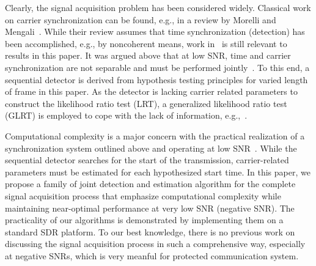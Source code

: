 Clearly, the signal acquisition problem has been considered widely. 
Classical work on carrier synchronization can be found, e.g., in a
review by  Morelli
and Mengali~\cite{Morelli_Mengali_98}. 
While their review assumes that time synchronization (detection) has been
accomplished, e.g., by noncoherent means, 
work in~\cite{kay_89,Fitz_94,Luise_Reggiannini_95}
is still relevant to results in this paper.
It was argued above that at low SNR, time and carrier synchronization
are not separable and must be performed jointly~\cite{purushothaman_16,kim_17}.
To this end, 
a sequential detector is derived from hypothesis testing principles
for varied length of frame in this paper.
As the detector is lacking carrier related parameters to construct 
the likelihood ratio test (LRT), a generalized likelihood ratio test (GLRT)
is employed to cope with the lack of information, e.g.,~\cite{liang_15}.

Computational complexity is a major concern with the practical
realization of a synchronization system outlined above and operating at low SNR~\cite{murin_16,wang_21}.
While the sequential detector searches for the start of the
transmission, carrier-related parameters must be estimated for each
hypothesized start time. In this paper,
we propose a family of joint detection and estimation algorithm 
for the complete signal acquisition process
that emphasize computational complexity while maintaining near-optimal performance at very low SNR (negative SNR).
The practicality of our algorithms is demonstrated by implementing
them on a standard SDR platform. To our best knowledge, there is no previous work on discussing 
the signal acquisition process in such a comprehensive way, especially at negative SNRs, which
is very meanful for protected communication system.



